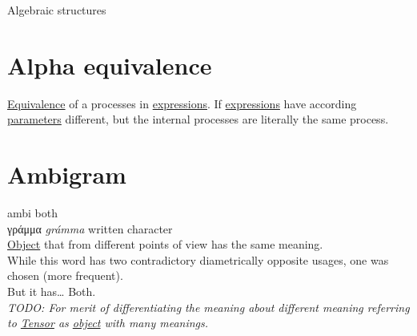 \documentclass[a4paper,14pt,oneside]{book}
\begin{document}
\label{org4757347}Algebraic structures\\

\chapter{\label{org3d28191}Alpha equivalence}
\label{sec:orgd2a96d5}
\hyperref[org663eda7]{Equivalence} of a processes in \hyperref[org8896d2c]{expressions}. If \hyperref[org8896d2c]{expressions} have according \hyperref[orga6d94f6]{parameters} different, but the internal processes are literally the same process.\\

\chapter{\label{orge864a2c}Ambigram}
\label{sec:org4ad5dbb}
ambi both\\
γράμμα \emph{grámma} written character\\

\hyperref[org5771609]{Object} that from different points of view has the same meaning.\\

While this word has two contradictory diametrically opposite usages, one was chosen (more frequent).\\

But it has\ldots{} Both.\\

\emph{TODO: For merit of differentiating the meaning about different meaning referring to \hyperref[orga2d4467]{Tensor} as \hyperref[org5771609]{object} with many meanings.}\\
\end{document}
